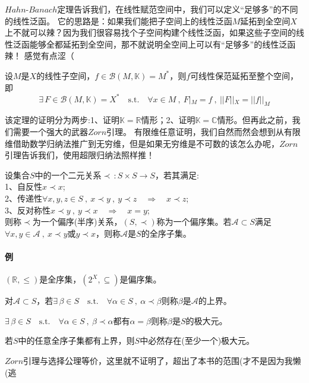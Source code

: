 $Hahn$-$Banach$定理告诉我们，在线性赋范空间中，我们可以定义“足够多”的不同的线性泛函。
它的思路是：如果我们能把子空间上的线性泛函$M$延拓到全空间$X$上不就可以辣？因为我们很容易找个子空间构建个线性泛函，如果这些子空间的线性泛函能够全都延拓到全空间，那不就说明全空间上可以有“足够多”的线性泛函辣！
感觉有点涩（
\begin{theorem}\label{HB}
    设$M$是$X$的线性子空间，$f \in \mathscr{B}(M,\mathbb{K})=M^*$，则$f$可线性保范延拓至整个空间，即
    \[\exists \, F \in \mathscr{B}(M,\mathbb{K})=X^* \quad \text{s.t.} \quad \forall x \in M \ , \ F|_M=f \ , \ ||F||_X=||f||_M\]
\end{theorem} 
该定理的证明分为两步:1、证明$\mathbb{K}=\mathbb{R}$情形；2、证明$\mathbb{K}=\mathbb{C}$情形。但再此之前，我们需要一个强大的武器$Zorn$引理。
有限维任意证明，我们自然而然会想到从有限维借助数学归纳法推广到无穷维，但是如果无穷维是不可数的该怎么办呢，$Zorn$引理告诉我们，使用超限归纳法照样推！
\begin{definition}[偏序(半序)关系]
    设集合$S$中的一个二元关系$\prec \, :S \times S \to S$，若其满足:\\
    1、自反性$x \prec x$;\\
    2、传递性$\forall x,y,z \in S \ , \ x \prec y \ , \ y \prec z \quad \Rightarrow \quad x \prec z$;\\
    3、反对称性$x \prec y \ , \ y \prec x \quad \Rightarrow \quad x=y$;\\
    则称$\prec$为一个偏序(半序)关系，$(S,\prec)$称为一个偏序集。若$\mathscr{A} \subset S$满足$\forall x,y \in \mathscr{A} \ , \ x \prec y$或$y \prec x$，则称$\mathscr{A}$是$S$的全序子集。
\end{definition}
\paragraph*{例} \quad $(\mathbb{R},\leq)$是全序集，$(2^X,\subseteq)$是偏序集。
\begin{definition}[上界]
    对$\mathscr{A} \subset S$，若$\exists \, \beta \in S \quad \text{s.t.} \quad \forall \alpha \in S \ , \ \alpha \prec \beta$则称$\beta$是$\mathscr{A}$的上界。
\end{definition}
\begin{definition}[极大元]
    $\exists \, \beta \in S \quad \text{s.t.} \quad \forall \alpha \in S \ , \ \beta \prec \alpha$都有$\alpha=\beta$则称$\beta$是$S$的极大元。
\end{definition}
\begin{theorem}[$Zorn$引理]\label{Zorn}
    若$S$中的任意全序子集都有上界，则$S$中必然存在(至少一个)极大元。
\end{theorem} 
$Zorn$引理与选择公理等价，这里就不证明了，超出了本书的范围(才不是因为我懒(逃

